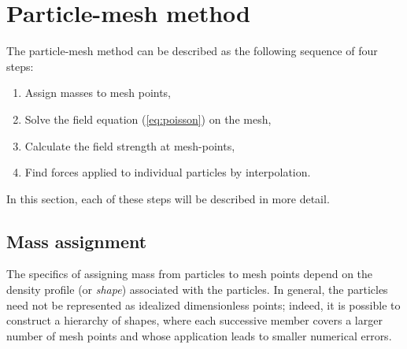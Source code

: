\section{Particle-mesh method}
The particle-mesh method can be described as the following sequence of four steps:
\begin{enumerate}
    \item Assign masses to mesh points,
    \item Solve the field equation (\autoref{eq:poisson}) on the mesh,
    \item Calculate the field strength at mesh-points,
    \item Find forces applied to individual particles by interpolation.
\end{enumerate}
In this section, each of these steps will be described in more detail.

\subsection{Mass assignment}\label{subsec:mass-assignment}
The specifics of assigning mass from particles to mesh points depend on the density profile (or \textit{shape}) associated with the particles.
In general, the particles need not be represented as idealized dimensionless points;
indeed, it is possible to construct a hierarchy of shapes, where each successive member covers a larger number of mesh points and whose application leads to smaller numerical errors.

